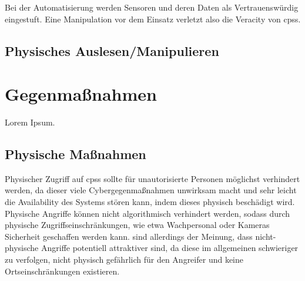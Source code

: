 \documentclass[final,bibliography=totocnumbered]{include/sikseminar}
\newcommand{\cps}{\glspl{cps}\xspace}
\begin{document}
Bei der Automatisierung werden Sensoren und deren Daten als Vertrauenswürdig eingestuft.
Eine Manipulation vor dem Einsatz verletzt also die Veracity von \cps.

\subsection{Physisches Auslesen/Manipulieren}


%



\section{Gegenmaßnahmen}\label{sec:gegenmassnahmen}





%

Lorem Ipsum.

\subsection{Physische Maßnahmen}\label{subsec:physisch}
Physischer Zugriff auf \cps sollte für unautorisierte Personen möglichst verhindert werden, da dieser viele Cybergegenmaßnahmen unwirksam macht und sehr leicht die Availability des Systems stören kann, indem dieses physisch beschädigt wird.
Physische Angriffe können nicht algorithmisch verhindert werden, sodass durch physische Zugriffseinschränkungen, wie etwa Wachpersonal oder Kameras Sicherheit geschaffen werden kann.
\citeauthor{CAS08} sind allerdings der Meinung, dass nicht-physische Angriffe potentiell attraktiver sind, da diese im allgemeinen schwieriger zu verfolgen, nicht physisch gefährlich für den Angreifer und keine Ortseinschränkungen existieren.
\end{document}
